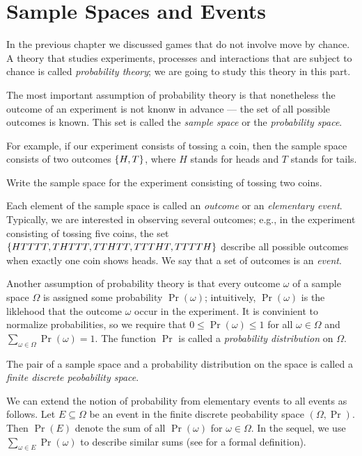 \chapter{Sample Spaces and Events}
In the previous chapter we discussed games that do not involve move by chance.
A theory that studies experiments, processes and interactions that are subject
to chance is called \emph{probability theory}; we are going to study this theory
in this part.

The most important assumption of probability theory is that nonetheless the
outcome of an experiment is not knonw in advance --- the set of all possible
outcomes is known. This set is called the \emph{sample space} or the
\emph{probability space}.

For example, if our experiment consists of tossing a coin, then the sample space
consists of two outcomes $\set{H, T}$, where $H$ stands for heads and $T$ stands
for tails.
\begin{exercise}
  Write the sample space for the experiment consisting of tossing two coins.
\end{exercise}
Each element of the sample space is called an \emph{outcome} or an
\emph{elementary event}. Typically, we are interested in observing several
outcomes; e.g., in the experiment consisting of tossing five coins, the set
$\set{HTTTT, THTTT, TTHTT, TTTHT, TTTTH}$ describe all possible outcomes when
exactly one coin shows heads. We say that a set of outcomes is an \emph{event}.

Another assumption of probability theory is that every outcome $\omega$ of a
sample space $\Omega$ is assigned some probability $\Pr(\omega)$; intuitively,
$\Pr(\omega)$ is the liklehood that the outcome $\omega$ occur in the
experiment. It is convinient to normalize probabilities, so we require that 
$0 \le \Pr(\omega) \le 1$ for all $\omega \in \Omega$ and 
$\sum_{\omega \in \Omega} \Pr(\omega) = 1$. The function $\Pr$ is called
a \emph{probability distribution} on $\Omega$.

The pair of a sample space and a probability distribution on the space is called
a \emph{finite discrete peobability space}.


We can extend the notion of probability from elementary events to all events as
follows. Let $E \subseteq \Omega$ be an event in the finite discrete peobability
space $(\Omega, \Pr)$. Then $\Pr(E)$ denote the sum of all $\Pr(\omega)$ for
$\omega \in \Omega$. In the sequel, we use $\sum_{\omega \in E} \Pr(\omega)$ to
describe similar sums (see  for a formal
definition).


